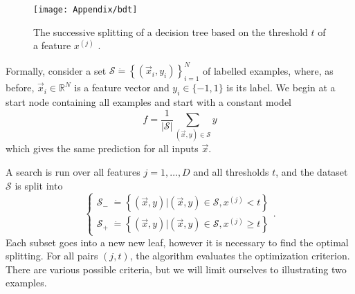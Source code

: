 \documentclass[10pt,a4paper]{book}
\begin{document}
\begin{figure}
\centering
\texttt{[image: Appendix/bdt]}
\caption{The successive splitting of a decision tree based on the threshold $t$ of a feature $x^{(j)}$ \cite{tree_image}.}
\label{tree}
\end{figure}

Formally, consider a set $\mathcal{S} \dot{=} \left\lbrace (\vec{x}_i, y_i) \right\rbrace_{i = 1}^N$ of labelled examples, where, as before, $\vec{x}_i \in \mathbb{R}^N$ is a feature vector and $y_i \in \lbrace -1, 1 \rbrace$ is its label. We begin at a start node containing all examples and start with a constant model
\begin{equation}
f = \frac{1}{\vert \mathcal{S} \vert} \sum_{(\vec{x},y) \in \mathcal{S}} y
\end{equation}
which gives the same prediction for all inputs $\vec{x}$.

A search is run over all features $j = 1, \dots, D$ and all thresholds $t$, and the dataset $\mathcal{S}$ is split into
\begin{equation}
\begin{cases}
\mathcal{S}_{-} \; \dot{=} \left\lbrace (\vec{x},y) \vert (\vec{x},y) \in \mathcal{S}, x^{(j)} < t \right\rbrace \\
\mathcal{S}_{+} \; \dot{=} \left\lbrace (\vec{x},y) \vert (\vec{x},y) \in \mathcal{S}, x^{(j)} \geq t \right\rbrace
\end{cases}.
\end{equation}
Each subset goes into a new new leaf, however it is necessary to find the optimal splitting. For all pairs $(j, t)$, the algorithm evaluates the optimization criterion. There are various possible criteria, but we will limit ourselves to illustrating two examples.
\end{document}
